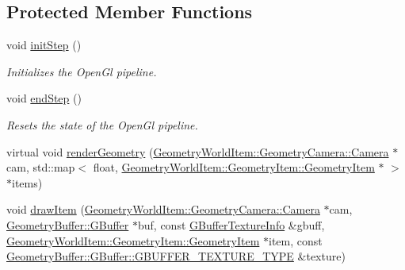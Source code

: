 \subsection*{Protected Member Functions}
\begin{DoxyCompactItemize}
\item 
\mbox{\label{class_geometry_engine_1_1_geometry_render_step_1_1_geometry_post_process_pass_a19c40efb46eb737b7a959ccc5c53b630}} 
void \mbox{\hyperlink{class_geometry_engine_1_1_geometry_render_step_1_1_geometry_post_process_pass_a19c40efb46eb737b7a959ccc5c53b630}{init\+Step}} ()
\begin{DoxyCompactList}\small\item\em Initializes the Open\+Gl pipeline. \end{DoxyCompactList}\item 
\mbox{\label{class_geometry_engine_1_1_geometry_render_step_1_1_geometry_post_process_pass_a98a3749437d57e8bb97237575fcdfb81}} 
void \mbox{\hyperlink{class_geometry_engine_1_1_geometry_render_step_1_1_geometry_post_process_pass_a98a3749437d57e8bb97237575fcdfb81}{end\+Step}} ()
\begin{DoxyCompactList}\small\item\em Resets the state of the Open\+Gl pipeline. \end{DoxyCompactList}\item 
virtual void \mbox{\hyperlink{class_geometry_engine_1_1_geometry_render_step_1_1_geometry_post_process_pass_a1150614ae61fe36f035b115db6f03625}{render\+Geometry}} (\mbox{\hyperlink{class_geometry_engine_1_1_geometry_world_item_1_1_geometry_camera_1_1_camera}{Geometry\+World\+Item\+::\+Geometry\+Camera\+::\+Camera}} $\ast$cam, std\+::map$<$ float, \mbox{\hyperlink{class_geometry_engine_1_1_geometry_world_item_1_1_geometry_item_1_1_geometry_item}{Geometry\+World\+Item\+::\+Geometry\+Item\+::\+Geometry\+Item}} $\ast$ $>$ $\ast$items)
\item 
void \mbox{\hyperlink{class_geometry_engine_1_1_geometry_render_step_1_1_geometry_post_process_pass_abee226b3176579ecd5a91022e8b9b26e}{draw\+Item}} (\mbox{\hyperlink{class_geometry_engine_1_1_geometry_world_item_1_1_geometry_camera_1_1_camera}{Geometry\+World\+Item\+::\+Geometry\+Camera\+::\+Camera}} $\ast$cam, \mbox{\hyperlink{class_geometry_engine_1_1_geometry_buffer_1_1_g_buffer}{Geometry\+Buffer\+::\+G\+Buffer}} $\ast$buf, const \mbox{\hyperlink{class_geometry_engine_1_1_g_buffer_texture_info}{G\+Buffer\+Texture\+Info}} \&gbuff, \mbox{\hyperlink{class_geometry_engine_1_1_geometry_world_item_1_1_geometry_item_1_1_geometry_item}{Geometry\+World\+Item\+::\+Geometry\+Item\+::\+Geometry\+Item}} $\ast$item, const \mbox{\hyperlink{class_geometry_engine_1_1_geometry_buffer_1_1_g_buffer_a718dceafcac1915f7de061108597e1cc}{Geometry\+Buffer\+::\+G\+Buffer\+::\+G\+B\+U\+F\+F\+E\+R\+\_\+\+T\+E\+X\+T\+U\+R\+E\+\_\+\+T\+Y\+PE}} \&texture)

\end{DoxyCompactItemize}
